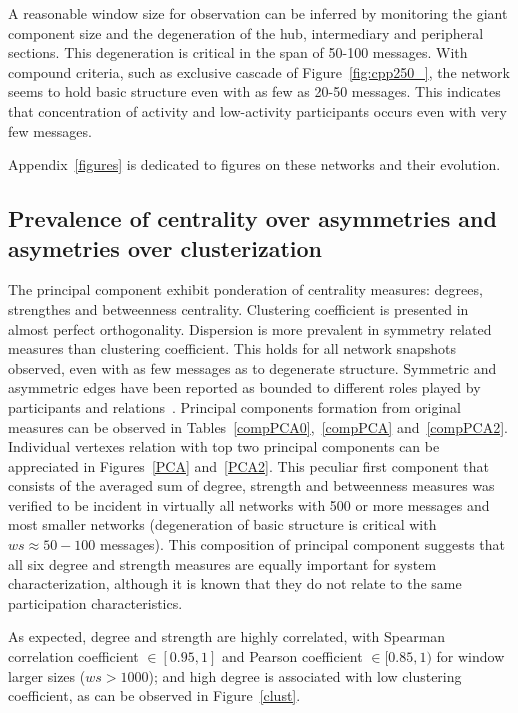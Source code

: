 \documentclass[%
 aip,
 jmp,%
 amsmath,amssymb,
 reprint,%
]{revtex4-1}
\begin{document}
A reasonable window size for observation can be inferred by monitoring the giant component size and the degeneration of the hub, intermediary and peripheral sections. This degeneration is critical in the span of 50-100 messages. With compound criteria, such as exclusive cascade of Figure~\ref{fig:cpp250_}, the network seems to hold basic structure even with as few as 20-50 messages. This indicates that concentration of activity and low-activity participants occurs even with very few messages.

Appendix~\ref{figures} is dedicated to figures on these networks and their evolution.


    \subsection{Prevalence of centrality over asymmetries and asymetries over clusterization}\label{prevalence}

The principal component exhibit ponderation of centrality measures: degrees, strengthes and betweenness centrality. Clustering coefficient is presented in almost perfect orthogonality. Dispersion is more prevalent in symmetry related measures than clustering coefficient. This holds for all network snapshots observed, even with as few messages as to degenerate structure. Symmetric and asymmetric edges have been reported as bounded to different roles played by participants and relations~\cite{newmanEvolving}. Principal components formation from original measures can be observed in Tables~\ref{compPCA0},~\ref{compPCA} and~\ref{compPCA2}. Individual vertexes relation with top two principal components can be appreciated in Figures~\ref{PCA} and~\ref{PCA2}.
This peculiar first component that consists of the averaged sum of degree, strength and betweenness measures was verified to be incident in virtually all networks with 500 or more messages and most smaller networks (degeneration of basic structure is critical with $ws \approx 50-100$ messages). This composition of principal component suggests that all six degree and strength measures are equally important for system characterization, although it is known that they do not relate to the same participation characteristics.

As expected, degree and strength are highly correlated, with Spearman correlation coefficient $\in [0.95,1]$ and Pearson coefficient $\in [0.85,1)$ for window larger sizes ($ws>1000$); and high degree is associated with low clustering coefficient, as can be observed in Figure~\ref{clust}.
\end{document}
